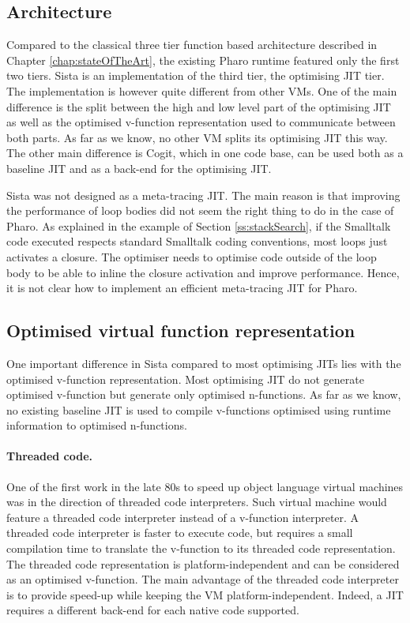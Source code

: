 \documentclass[a4paper,12pt,twoside]{../includes/ThesisStyle}
\begin{document}
\subsection{Architecture}
\label{sec:relWArch}

Compared to the classical three tier function based architecture described in Chapter \ref{chap:stateOfTheArt}, the existing Pharo runtime featured only the first two tiers. Sista is an implementation of the third tier, the optimising JIT tier. The implementation is however quite different from other VMs. One of the main difference is the split between the high and low level part of the optimising JIT as well as the optimised v-function representation used to communicate between both parts. As far as we know, no other VM splits its optimising JIT this way. The other main difference is Cogit, which in one code base, can be used both as a baseline JIT and as a back-end for the optimising JIT.

Sista was not designed as a meta-tracing JIT. The main reason is that improving the performance of loop bodies did not seem the right thing to do in the case of Pharo. As explained in the example of Section \ref{ss:stackSearch}, if the Smalltalk code executed respects standard Smalltalk coding conventions, most loops just activates a closure. The optimiser needs to optimise code outside of the loop body to be able to inline the closure activation and improve performance. Hence, it is not clear how to implement an efficient meta-tracing JIT for Pharo.

\subsection{Optimised virtual function representation}
\label{sec:interface}

One important difference in Sista compared to most optimising JITs lies with the optimised v-function representation. Most optimising JIT do not generate optimised v-function but generate only optimised n-functions. As far as we know, no existing baseline JIT is used to compile v-functions optimised using runtime information to optimised n-functions.

\paragraph{Threaded code.}
One of the first work in the late 80s to speed up object language virtual machines was in the direction of threaded code interpreters. Such virtual machine would feature a threaded code interpreter instead of a v-function interpreter. A threaded code interpreter is faster to execute code, but requires a small compilation time to translate the v-function to its threaded code representation. The threaded code representation is platform-independent and can be considered as an optimised v-function. The main advantage of the threaded code interpreter is to provide speed-up while keeping the VM platform-independent. Indeed, a JIT requires a different back-end for each native code supported. 
\end{document}
